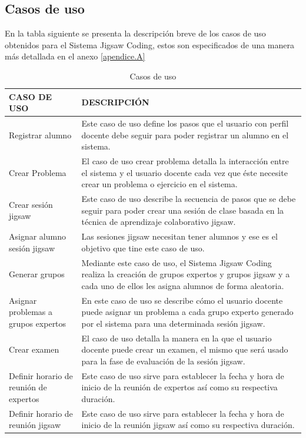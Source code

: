 \subsection{Casos de uso}
En la tabla siguiente se presenta la descripción breve de los casos de uso obtenidos para el Sistema Jigsaw Coding, estos son especificados de una manera más detallada en el anexo \ref{apendice.A}\\
\clearpage
\begin{longtable}{|L{4cm}|L{9cm}|}
	\caption{Casos de uso}
	\label{tab:das_casosdeuso}\\
	\hline
	CASO DE USO & DESCRIPCIÓN \\
	\hline
	Registrar alumno & Este caso de uso define los pasos que el usuario con perfil docente debe seguir para poder registrar un alumno en el sistema.\\
	\hline
	Crear Problema & El caso de uso crear problema detalla la interacción entre el sistema y el usuario docente cada vez que éste necesite crear un problema o ejercicio en el sistema.\\
	\hline
	Crear sesión jigsaw & Este caso de uso describe la secuencia de pasos que se debe seguir para poder crear una sesión de clase basada en la técnica de aprendizaje colaborativo jigsaw.\\
	\hline
	Asignar alumno sesión jigsaw & Las sesiones jigsaw necesitan tener alumnos y ese es el objetivo que tine este caso de uso.\\
	\hline
	Generar grupos & Mediante este caso de uso, el Sistema Jigsaw Coding realiza la creación de grupos expertos y grupos jigsaw y a cada uno de ellos les asigna alumnos de forma aleatoria.\\
	\hline
	Asignar problemas a grupos expertos & En este caso de uso se describe cómo el usuario docente puede asignar un problema a cada grupo experto generado por el sistema para una determinada sesión jigsaw.\\
	\hline
	Crear examen & El caso de uso detalla la manera en la que el usuario docente puede crear un examen, el mismo que será usado para la fase de evaluación de la sesión jigsaw.\\
	\hline
	Definir horario de reunión de expertos & Este caso de uso sirve para establecer la fecha y hora de inicio de la reunión de expertos así como su respectiva duración.\\
	\hline
	Definir horario de reunión jigsaw & Este caso de uso sirve para establecer la fecha y hora de inicio de la reunión jigsaw así como su respectiva duración.\\

\end{longtable}
